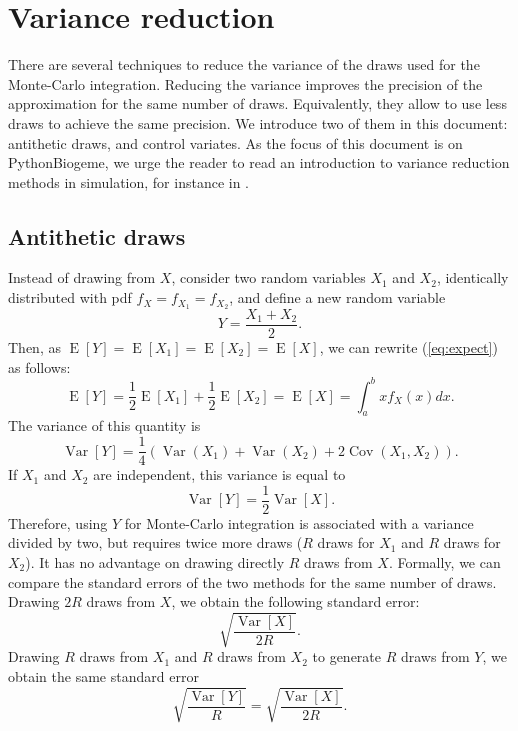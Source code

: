 \documentclass[12pt,a4paper]{article}
\newcommand{\req}[1]{(\ref{#1})}
\newcommand{\expect}{\operatorname{E}}
\newcommand{\var}{\operatorname{Var}}
\newcommand{\cov}{\operatorname{Cov}}
\newcommand{\PBIOGEME}{PythonBiogeme}
\begin{document}
\section{Variance reduction}

There are several techniques to reduce the variance of the draws used
for the Monte-Carlo integration. Reducing the variance improves the
precision of the approximation for the same number of
draws. Equivalently, they allow to use less draws to achieve the same
precision. We introduce two of them in this document: antithetic
draws, and control variates. As the focus of this document is on
\PBIOGEME, we urge the reader to read an introduction to variance
reduction methods in simulation, for instance in .


\subsection{Antithetic draws}
\label{sec:antithetic}

Instead of drawing from $X$, consider two random variables $X_1$ and $X_2$, identically distributed
with pdf $f_X=f_{X_1}=f_{X_2}$, and define a new random variable
\begin{equation}
Y = \frac{X_1+X_2}{2}.
\end{equation}
 Then, as
$\expect[Y]=\expect[X_1]=\expect[X_2]=\expect[X]$, we can rewrite \req{eq:expect}
as follows:
\begin{equation}
\expect[Y] = \frac{1}{2} \expect[X_1] +
\frac{1}{2} \expect[X_2] = \expect[X] = \int_{a}^{b} x f_X(x) dx.
\end{equation}
The variance of this quantity is 
\begin{equation}
\label{eq:varY}
\var[Y] = \frac{1}{4}(\var(X_1)+\var(X_2)+2\cov(X_1,X_2)).
\end{equation}
If $X_1$ and $X_2$  are independent, this variance is equal to
\begin{equation}
\var[Y] = \frac{1}{2}\var[X].
\end{equation}
Therefore, using $Y$ for Monte-Carlo integration is associated with a
variance divided by two, but requires twice more draws ($R$ draws for $X_1$
and $R$ draws for $X_2$). It has no advantage on drawing directly $R$
draws from $X$. Formally, we can compare the standard errors of the
two methods for the same number of draws. Drawing $2R$ draws from $X$,
we obtain the following standard error:
\begin{equation}
\sqrt{\frac{\var[X]}{2R}}.
\end{equation}
Drawing $R$ draws from $X_1$ and $R$ draws from $X_2$ to generate $R$
draws from $Y$, we obtain the
same standard error
\begin{equation}
\sqrt{\frac{\var[Y]}{R}} = \sqrt{\frac{\var[X]}{2R}}. 
\end{equation}
\end{document}
